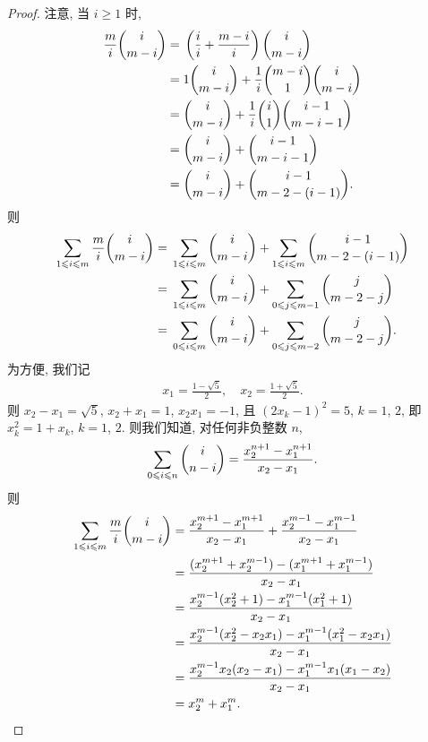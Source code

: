 \documentclass[../libro.tex]{subfiles}
\begin{document}
\begin{proof}
    注意, 当 \(i \geq 1\) 时,
    \begin{align*}
        \dfrac{m}{i} \dbinom{i}{m - i}
        = {} &
        \left(\frac{i}{i} + \frac{m-i}{i}\right)
        \dbinom{i}{m - i}
        \\
        = {} &
        1 \dbinom{i}{m - i} + \frac{1}{i} \dbinom{m-i}{1} \dbinom{i}{m-i}
        \\
        = {} &
        \dbinom{i}{m - i} + \frac{1}{i} \dbinom{i}{1} \dbinom{i-1}{m-i-1}
        \\
        = {} &
        \dbinom{i}{m - i} + \dbinom{i-1}{m-i-1}
        \\
        = {} &
        \dbinom{i}{m-i} + \dbinom{i-1}{m-2-(i-1)}.
    \end{align*}
    则
    \begin{align*}
        \sum_{1 \leq i \leq m} {\dfrac{m}{i} \dbinom{i}{m - i}}
        = {} &
        \sum_{1 \leq i \leq m} {\dbinom{i}{m-i}}
        + \sum_{1 \leq i \leq m} {\dbinom{i-1}{m-2-(i-1)}}
        \\
        = {} &
        \sum_{1 \leq i \leq m} {\dbinom{i}{m-i}}
        + \sum_{0 \leq j \leq m-1} {\dbinom{j}{m-2-j}}
        \\
        = {} &
        \sum_{0 \leq i \leq m} {\dbinom{i}{m-i}}
        + \sum_{0 \leq j \leq m-2} {\dbinom{j}{m-2-j}}.
    \end{align*}
    为方便, 我们记
    \begin{align*}
        x_1 = \frac{1 - \sqrt{5}}{2},
        \quad
        x_2 = \frac{1 + \sqrt{5}}{2}.
    \end{align*}
    则 \(x_2 - x_1 = \sqrt{5}\),
    \(x_2 + x_1 = 1\),
    \(x_2 x_1 = -1\),
    且 \((2 x_k - 1)^2 = 5\), \(k = 1\), \(2\),
    即 \(x_k^2 = 1 + x_k\), \(k = 1\), \(2\).
    则我们知道,
    对任何非负整数 \(n\),
    \begin{align*}
        \sum_{0 \leq i \leq n} {\dbinom{i}{n-i}}
        = \frac{x_2^{n+1} - x_1^{n+1}}{x_2 - x_1}.
    \end{align*}
    则
    \begin{align*}
        \sum_{1 \leq i \leq m} {\dfrac{m}{i} \dbinom{i}{m - i}}
        = {} &
        \frac{x_2^{m+1} - x_1^{m+1}}{x_2 - x_1}
        + \frac{x_2^{m-1} - x_1^{m-1}}{x_2 - x_1}
        \\
        = {} &
        \frac{(x_2^{m+1} + x_2^{m-1})
        - (x_1^{m+1} + x_1^{m-1})}{x_2 - x_1}
        \\
        = {} &
        \frac{x_2^{m-1} (x_2^2 + 1)
        - x_1^{m-1} (x_1^2 + 1)}{x_2 - x_1}
        \\
        = {} &
        \frac{x_2^{m-1} (x_2^2 - x_2 x_1)
        - x_1^{m-1} (x_1^2 - x_2 x_1)}{x_2 - x_1}
        \\
        = {} &
        \frac{x_2^{m-1} x_2 (x_2 - x_1)
        - x_1^{m-1} x_1 (x_1 - x_2)}{x_2 - x_1}
        \\
        = {} &
        x_2^m + x_1^m.
        \qedhere
    \end{align*}
\end{proof}
\end{document}
